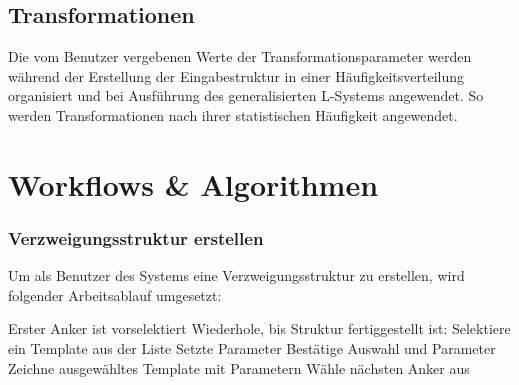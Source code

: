 \subsection*{Transformationen}
Die vom Benutzer vergebenen Werte der Transformationsparameter werden während der Erstellung der Eingabestruktur in
einer Häufigkeitsverteilung organisiert und bei Ausführung des generalisierten L-Systems angewendet.
So werden Transformationen nach ihrer statistischen Häufigkeit angewendet.

\newpage

\section{Workflows \& Algorithmen}
\label{algo}

\subsubsection*{Verzweigungsstruktur erstellen}
Um als Benutzer des Systems eine Verzweigungsstruktur zu erstellen, wird folgender Arbeitsablauf umgesetzt:
\begin{algorithm}[caption={Erstellen einer Verzweigungsstruktur}, label={alg1}]
    Erster Anker ist vorselektiert
    Wiederhole, bis Struktur fertiggestellt ist:
        Selektiere ein Template aus der Liste
        Setzte Parameter
        Bestätige Auswahl und Parameter
        Zeichne ausgewähltes Template mit Parametern
        Wähle nächsten Anker aus
\end{algorithm}

